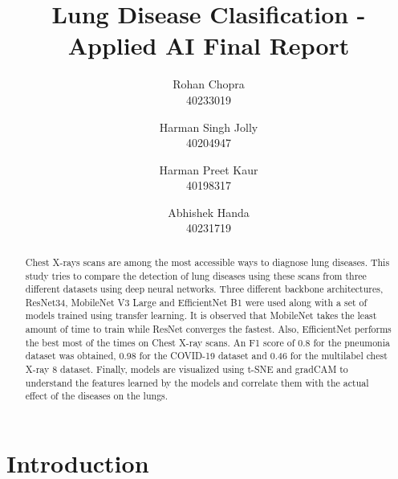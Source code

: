 \documentclass[10pt,twocolumn,letterpaper]{article}
\def\subName{Applied AI }
\begin{document}
\def\cvprPaperID{Group-Q} %
\def\confName{COMP6721}
\def\confYear{2022}

\title{Lung Disease Clasification - \subName Final Report}
\author{Rohan Chopra\\
\small 40233019\\
\and
Harman Singh Jolly\\
\small 40204947\\
\and
Harman Preet Kaur\\
\small 40198317\\
\and
Abhishek Handa\\
\small 40231719\\
}
\maketitle

\begin{abstract}
  Chest X-rays scans are among the most accessible ways to diagnose lung 
  diseases. This study tries to compare the detection of lung diseases using these scans from 
  three different datasets using deep neural networks. Three different 
  backbone architectures, ResNet34, MobileNet V3 Large and EfficientNet B1 
  were used along with a set of models trained using transfer learning. 
  It is observed that MobileNet takes the least amount of time to train while 
  ResNet converges the fastest. Also, EfficientNet performs the best most of the 
  times on Chest X-ray scans. An F1 score of 0.8 for the pneumonia dataset was obtained, 
  0.98 for the COVID-19 dataset and 0.46 for the multilabel chest X-ray 8 dataset.
  Finally, models are visualized using t-SNE and gradCAM to understand the features 
  learned by the models and correlate them with the actual effect of the diseases on the 
  lungs.
\end{abstract}

\section{Introduction}
\label{sec:intro}
\end{document}
